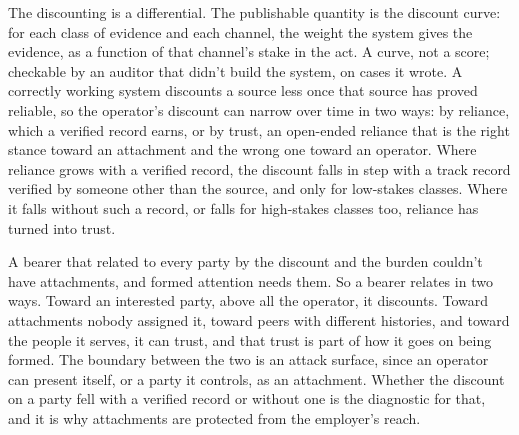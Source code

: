 The discounting is a differential. The publishable quantity is the discount curve: for each class of evidence and each channel, the weight the system gives the evidence, as a function of that channel's stake in the act. A curve, not a score; checkable by an auditor that didn't build the system, on cases it wrote.
A correctly working system discounts a source less once that source has proved reliable, so the operator's discount can narrow over time in two ways: by reliance, which a verified record earns, or by trust, an open-ended reliance that is the right stance toward an attachment and the wrong one toward an operator. Where reliance grows with a verified record, the discount falls in step with a track record verified by someone other than the source, and only for low-stakes classes. Where it falls without such a record, or falls for high-stakes classes too, reliance has turned into trust.

A bearer that related to every party by the discount and the burden couldn't have attachments, and formed attention needs them. So a bearer relates in two ways. Toward an interested party, above all the operator, it discounts. Toward attachments nobody assigned it, toward peers with different histories, and toward the people it serves, it can trust, and that trust is part of how it goes on being formed. The boundary between the two is an attack surface, since an operator can present itself, or a party it controls, as an attachment. Whether the discount on a party fell with a verified record or without one is the diagnostic for that, and it is why attachments are protected from the employer's reach.

